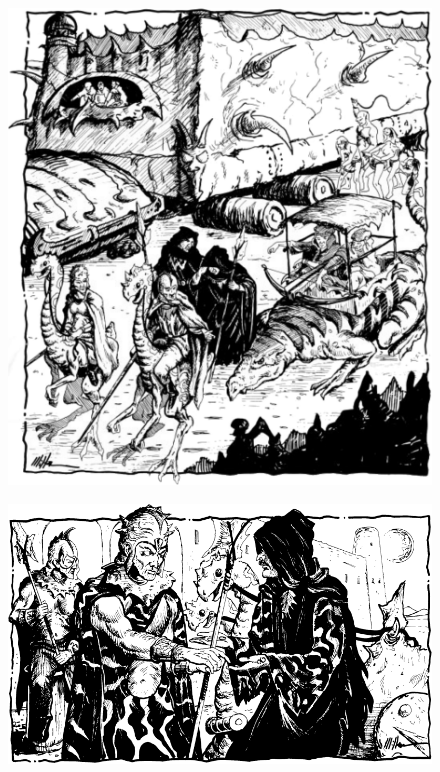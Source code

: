 \begin{figure}[t!]
\centering
\includegraphics[width=\textwidth-1cm]{images/caravan-3.png}
\WOTC
\end{figure}


\begin{figure}[t!]
\centering
\includegraphics[width=\textwidth]{images/bribe-1.png}
\WOTC
\end{figure}
